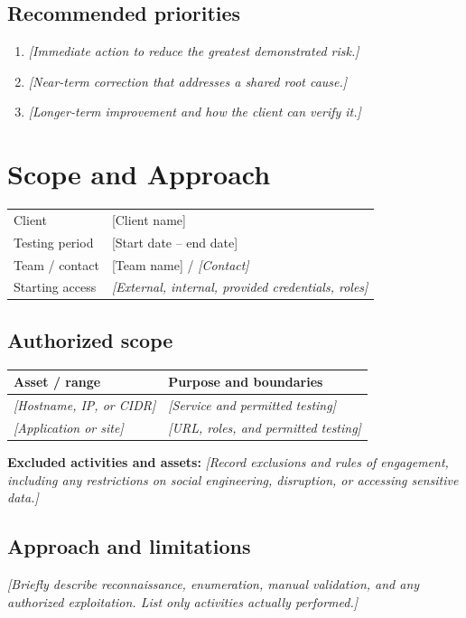 \documentclass[11pt,letterpaper]{article}
\newcommand{\ClientName}{[Client name]}
\newcommand{\TeamName}{[Team name]}
\newcommand{\TestingDates}{[Start date -- end date]}
\newcommand{\prompt}[1]{\textit{\textcolor{muted}{[#1]}}}
\begin{document}
\subsection*{Recommended priorities}
\begin{enumerate}
  \item \prompt{Immediate action to reduce the greatest demonstrated risk.}
  \item \prompt{Near-term correction that addresses a shared root cause.}
  \item \prompt{Longer-term improvement and how the client can verify it.}
\end{enumerate}

\clearpage
\section{Scope and Approach}
\begin{tabularx}{\textwidth}{@{}lY@{}}
  \toprule
  Client & \ClientName \\
  Testing period & \TestingDates \\
  Team / contact & \TeamName{} / \prompt{Contact} \\
  Starting access & \prompt{External, internal, provided credentials, roles} \\
  \bottomrule
\end{tabularx}

\subsection{Authorized scope}
\begin{tabularx}{\textwidth}{@{}p{}Y@{}}
  \toprule
  \textbf{Asset / range} & \textbf{Purpose and boundaries} \\
  \midrule
  \prompt{Hostname, IP, or CIDR} & \prompt{Service and permitted testing} \\
  \prompt{Application or site} & \prompt{URL, roles, and permitted testing} \\
  \bottomrule
\end{tabularx}

\textbf{Excluded activities and assets:}
\prompt{Record exclusions and rules of engagement, including any restrictions
on social engineering, disruption, or accessing sensitive data.}

\subsection{Approach and limitations}
\prompt{Briefly describe reconnaissance, enumeration, manual validation,
and any authorized exploitation. List only activities actually performed.}
\end{document}

